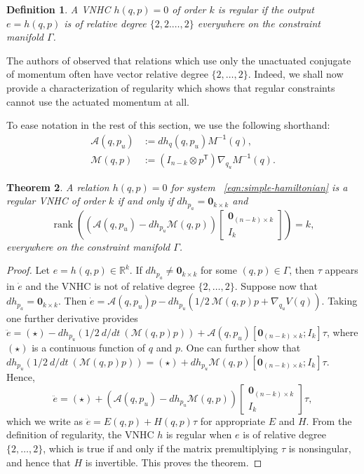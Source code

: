 \documentclass[journal,twoside,web]{ieeecolor}
\newtheorem{thm}{Theorem}%
\newtheorem{defn}[thm]{Definition} %
\DeclareMathOperator{\Rank}{rank}
\newcommand*{\rank}[1]{\Rank\left(#1\right)}
\newcommand*{\tpose}{^\mathsf{T}}
\newcommand*{\R}{\mathbb{R}}
\newcommand*{\Minv}{M^\mathsf{-1}}
\newcommand*{\Id}[1]{I_{#1}}
\newcommand*{\Zmat}[1]{\bm{0}_{#1}}
\newcommand*{\simpleB}{\begin{bmatrix}\Zmat{(n-k)\times k}\\ \Id{k}\end{bmatrix}}
\begin{document}
\begin{defn}
    A VNHC \(h(q,p) = 0\) of order \(k\) is \textit{regular} if the output 
    \(e = h(q,p)\) is of relative degree \(\{2,2.\ldots,2\}\) everywhere on the
    constraint manifold \(\Gamma\).
\end{defn}

The authors of
\cite{nhvc_dynamic_walking,hybrid_zero_dynamics_bipedal_nhvcs}
observed that relations which use only the unactuated conjugate of momentum
often have vector relative degree \(\{2,\ldots,2\}\).
Indeed, we shall now provide a characterization of regularity which shows that
regular constraints cannot use the actuated momentum at all.

To ease notation in the rest of this section, we use the following shorthand:
\begin{align}
    \mathcal{A}(q,p_u) &:= dh_q(q,p_u) \Minv(q) 
        ,\\
    \mathcal{M}(q,p) &:= (\Id{n-k} \otimes p\tpose)\nabla_{q_u}\Minv(q) 
    .
\end{align}

\begin{thm}\label{thm:vnhc-regularity}
    A relation \(h(q,p) = 0\) for system ~\eqref{eqn:simple-hamiltonian}
    is a regular VNHC of order \(k\) if and only if 
    \(dh_{p_a} = \Zmat{k \times k}\) 
    and
    \[
        \rank{\left(\mathcal{A}(q,p_u) - dh_{p_u}\mathcal{M}(q,p)\right)\simpleB} = k
         ,
    \]
    everywhere on the constraint manifold \(\Gamma\).
\end{thm}
\begin{proof}
    Let \(e = h(q,p) \in \R^k\).
    If \(dh_{p_a} \neq \Zmat{k\times k}\) for some \((q,p) \in \Gamma\), 
    then \(\tau\) appears in \(\dot{e}\) and the VNHC is not of relative degree
    \(\{2,\ldots,2\}\). Suppose now that \(dh_{p_a} = \Zmat{k\times k}\).
    Then 
    \(\dot{e} = \mathcal{A}(q,p_u)p - 
     dh_{p_u}\left(1/2~\mathcal{M}(q,p)p + \nabla_{q_u}V(q)\right)\).
    Taking one further derivative provides
    \( \ddot{e} = (\star) - 
        dh_{p_u}\left(1/2~d/dt~\left(\mathcal{M}(q,p)p\right)\right) 
        + \mathcal{A}(q,p_u)[\Zmat{(n-k)\times k};\Id{k}] \tau\),
    where \((\star)\) is a continuous function of \(q\) and \(p\).
    One can further show that
    \(dh_{p_u}\left(1/2~d/dt~\left(\mathcal{M}(q,p)p\right)\right)
        = (\star) + dh_{p_u}\mathcal{M}(q,p)[\Zmat{(n-k)\times k};
        \Id{k}]\tau\).
    Hence,
    \[
       \ddot{e} = (\star) +
       \left(\mathcal{A}(q,p_u) - dh_{p_u}\mathcal{M}(q,p)\right) \simpleB \tau
        ,
    \]
    which we write as \( \ddot{e} = E(q,p) + H(q,p)\tau\) for appropriate \(E\)
    and \(H\).
    From the definition of regularity, the VNHC \(h\) is regular 
    when \(e\) is of relative degree \(\{2,\ldots,2\}\), which is true 
    if and only if the matrix premultiplying \(\tau\) is nonsingular, and hence
    that \(H\) is invertible. This proves the theorem.
\end{proof}
\end{document}
